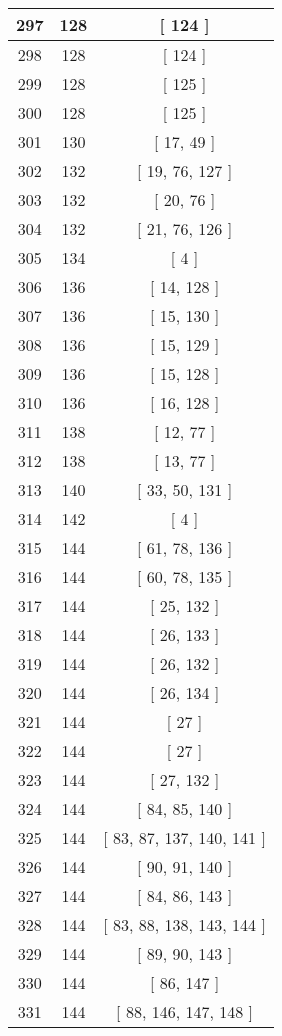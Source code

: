 \begin{center}
\begin{longtable}[H]{|| c c c ||}
\\\hline
297 & 128 & [ 124 ]
\\\hline
298 & 128 & [ 124 ]
\\\hline
299 & 128 & [ 125 ]
\\\hline
300 & 128 & [ 125 ]
\\\hline
301 & 130 & [ 17, 49 ]
\\\hline
302 & 132 & [ 19, 76, 127 ]
\\\hline
303 & 132 & [ 20, 76 ]
\\\hline
304 & 132 & [ 21, 76, 126 ]
\\\hline
305 & 134 & [ 4 ]
\\\hline
306 & 136 & [ 14, 128 ]
\\\hline
307 & 136 & [ 15, 130 ]
\\\hline
308 & 136 & [ 15, 129 ]
\\\hline
309 & 136 & [ 15, 128 ]
\\\hline
310 & 136 & [ 16, 128 ]
\\\hline
311 & 138 & [ 12, 77 ]
\\\hline
312 & 138 & [ 13, 77 ]
\\\hline
313 & 140 & [ 33, 50, 131 ]
\\\hline
314 & 142 & [ 4 ]
\\\hline
315 & 144 & [ 61, 78, 136 ]
\\\hline
316 & 144 & [ 60, 78, 135 ]
\\\hline
317 & 144 & [ 25, 132 ]
\\\hline
318 & 144 & [ 26, 133 ]
\\\hline
319 & 144 & [ 26, 132 ]
\\\hline
320 & 144 & [ 26, 134 ]
\\\hline
321 & 144 & [ 27 ]
\\\hline
322 & 144 & [ 27 ]
\\\hline
323 & 144 & [ 27, 132 ]
\\\hline
324 & 144 & [ 84, 85, 140 ]
\\\hline
325 & 144 & [ 83, 87, 137, 140, 141 ]
\\\hline
326 & 144 & [ 90, 91, 140 ]
\\\hline
327 & 144 & [ 84, 86, 143 ]
\\\hline
328 & 144 & [ 83, 88, 138, 143, 144 ]
\\\hline
329 & 144 & [ 89, 90, 143 ]
\\\hline
330 & 144 & [ 86, 147 ]
\\\hline
331 & 144 & [ 88, 146, 147, 148 ]
\\\hline

\end{longtable}
\end{center}
